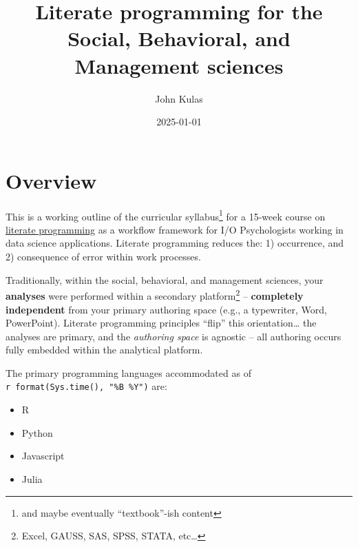 \documentclass[
  letterpaper,
  DIV=11,
  numbers=noendperiod,
  oneside]{scrreprt}
\title{Literate programming for the Social, Behavioral, and Management
sciences}
\author{John Kulas}
\date{2025-01-01}
\providecommand{\tightlist}{%
  \setlength{\itemsep}{0pt}\setlength{\parskip}{0pt}}\usepackage{longtable,booktabs,array}
\renewcommand*\contentsname{Table of contents}
\newcommand\contentsname{Table of contents}
\begin{document}
\maketitle

\renewcommand*\contentsname{Table of contents}
{
\hypersetup{linkcolor=}
\setcounter{tocdepth}{2}
\tableofcontents
}


\chapter*{Overview}\label{overview}


This is a working outline of the curricular syllabus\footnote{and maybe
  eventually ``textbook''-ish content} for a 15-week course on
\href{https://www-cs-faculty.stanford.edu/~knuth/lp.html}{literate
programming} as a workflow framework for I/O Psychologists working in
data science applications. Literate programming reduces the: 1)
occurrence, and 2) consequence of error within work processes.

Traditionally, within the social, behavioral, and management sciences,
your \textbf{analyses} were performed within a secondary
platform\footnote{Excel, GAUSS, SAS, SPSS, STATA, etc\ldots{}} --
\textbf{completely independent} from your primary authoring space (e.g.,
a typewriter, Word, PowerPoint). Literate programming principles
``flip'' this orientation\ldots{} the analyses are primary, and the
\emph{authoring space} is agnostic -- all authoring occurs fully
embedded within the analytical platform.

The primary programming languages accommodated as of
\texttt{r\ format(Sys.time(),\ "\%B\ \%Y")} are:

\begin{itemize}
\tightlist
\item
  R
\item
  Python
\item
  Javascript
\item
  Julia
\end{itemize}
\end{document}
